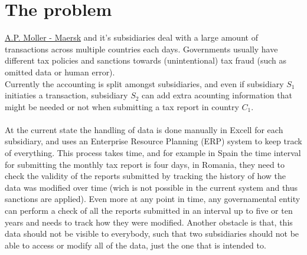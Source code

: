 \section{The problem}
\href{http://www.maersk.com}{A.P. Moller - Maersk} and it's subsidiaries deal with a large amount of transactions across multiple countries each days. Governments usually have different tax policies and sanctions towards (unintentional) tax fraud (such as omitted data or human error).\\
Currently the accounting is split amongst subsidiaries, and even if subsidiary $S_1$ initiaties a transaction, subsidiary $S_2$ can add extra acounting information that might be needed or not when submitting a tax report in country $C_1$.\\
\\
At the current state the handling of data is done manually in Excell for each subsidiary, and uses an Enterprise Resource Planning (ERP) system to keep track of everything. This process takes time, and for example in Spain the time interval for submitting the monthly tax report is four days, in Romania, they need to check the validity of the reports submitted by tracking the history of how the data was modified over time (wich is not possible in the current system and thus sanctions are applied). Even more at any point in time, any governamental entity can perform a check of all the reports submitted in an interval up to five or ten years and needs to track how they were modified. Another obstacle is that, this data should not be visible to everybody, such that two subsidiaries should not be able to access or modify all of the data, just the one that is intended to.\\
\\
